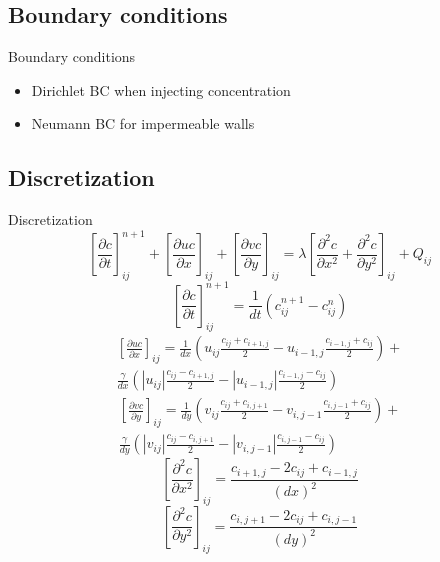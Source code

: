 \documentclass[t,mathserif]{beamer}
\begin{document}
\subsection{Boundary conditions}
\begin{frame}{Boundary conditions}
\begin{itemize}
	\item Dirichlet BC when injecting concentration
	\item Neumann BC for impermeable walls
\end{itemize}
\end{frame}

\subsection{Discretization}
\begin{frame}[allowframebreaks]{Discretization}
\begin{equation}
\left \lbrack \frac{\partial c}{\partial t} \right \rbrack_{ij}^{n+1} + \left
\lbrack \frac{\partial uc}{\partial x} \right \rbrack_{ij} + \left \lbrack
\frac{\partial vc}{\partial y} \right \rbrack_{ij} = \lambda \left \lbrack
\frac{\partial^2 c}{\partial x^2} + \frac{\partial^2 c}{\partial y^2} \right \rbrack_{ij} + Q_{ij}
\end{equation}
\begin{equation}
\left \lbrack \frac{\partial c}{\partial t} \right \rbrack_{ij}^{n+1} =
\frac{1}{dt} \left (c_{ij}^{n+1} - c_{ij}^n \right )
\end{equation}
\begin{equation}
\begin{aligned}
\left \lbrack \frac{\partial uc}{\partial x} \right \rbrack_{ij} =
\frac{1}{dx} \left (u_{ij} \frac{c_{ij}+c_{i+1,j}}{2} - u_{i-1,j}
\frac{c_{i-1,j}+c_{ij}}{2} \right) + \\
\frac{\gamma}{dx} \left (|u_{ij}| \frac{c_{ij}-c_{i+1,j}}{2} - |u_{i-1,j}|
\frac{c_{i-1,j}-c_{ij}}{2} \right)
\end{aligned}
\end{equation}
\pagebreak
\begin{equation}
\begin{aligned}
\left \lbrack \frac{\partial vc}{\partial y} \right \rbrack_{ij} =
\frac{1}{dy} \left (v_{ij} \frac{c_{ij}+c_{i,j+1}}{2} - v_{i,j-1}
\frac{c_{i,j-1}+c_{ij}}{2} \right) + \\
\frac{\gamma}{dy} \left (|v_{ij}| \frac{c_{ij}-c_{i,j+1}}{2} - |v_{i,j-1}|
\frac{c_{i,j-1}-c_{ij}}{2} \right)
\end{aligned}
\end{equation}
\begin{equation}
\left \lbrack \frac{\partial^2 c}{\partial x^2} \right \rbrack_{ij} =
\frac{c_{i+1,j} -2 c_{ij} + c_{i-1,j}}{(dx)^2}
\end{equation}
\begin{equation}
\left \lbrack \frac{\partial^2 c}{\partial y^2} \right \rbrack_{ij} =
\frac{c_{i,j+1} -2 c_{ij} + c_{i,j-1}}{(dy)^2}
\end{equation}


\end{frame}
\end{document}
